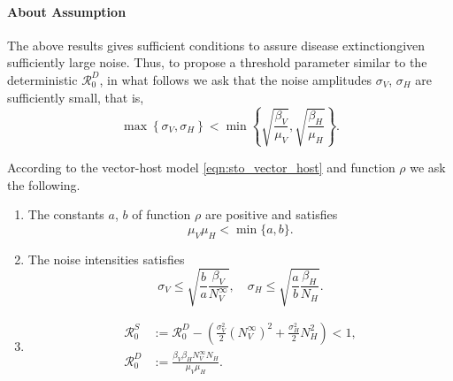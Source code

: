 \paragraph{About Assumption}
The above results gives sufficient conditions to assure 
disease extinction\textemdash given sufficiently large noise. Thus, 
to propose a threshold parameter similar  to the deterministic
$\mathcal{R}_0^D$, in what follows we ask that the noise amplitudes 
$\sigma_V$, $\sigma_H$ are sufficiently small, that is,
\begin{equation}\label{eqn:noise_small_condition}
    \displaystyle
    \max
        \left \{
              \sigma_V, \sigma_H 
        \right\} 
        < 
    \min 
        \left \{
            \sqrt{\frac{\beta_V}{\mu_V}},
            \sqrt{\frac{\beta_H}{\mu_H}}
        \right \}.
\end{equation}
%
%
%
\begin{assumption}\label{ass:extinction}
    According to the vector-host model \eqref{eqn:sto_vector_host} and 
    function
    $\rho$
    we ask the following.
    \begin{enumerate}[\bf{(E\textendash}1)]
        \item 
            The constants $a$, $b$ of function $\rho$ are positive and satisfies
            $$
                \mu_V \mu_H < \min \{a, b \}.
            $$
        \item \label{ass:noise_condition}
            The noise intensities satisfies
            $$
                \sigma_V \leq 
                    \sqrt{
                        \frac{b}{a}
                        \frac{\beta_V}{N_V^{\infty}}
                        },
                 \quad
                \sigma_H \leq
                    \sqrt{
                        \frac{a}{b}
                        \frac{\beta_H }{N_H
                    }}.
            $$
        \item
            \begin{equation*}
                \begin{aligned}
                    \mathcal{R}_0 ^ S &:=
                        \mathcal{R}_0^D - 
                        \left( 
                            \frac{\sigma_V ^ 2}{2} (N_V ^ {\infty}) ^ 2
                            +
                            \frac{\sigma_H ^ 2}{2} N_H ^ 2
                        \right)
                        <1,
                        \\
                    \mathcal{R}_0 ^ D &:=
                            \frac{
                                \beta_V \beta_H N_V ^ \infty N_H}{\mu_V \mu_H} .
                \end{aligned}
            \end{equation*}
    \end{enumerate}
\end{assumption}        
